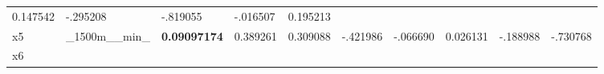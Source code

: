 \documentclass[11pt]{article}
\begin{document}
\begin{longtable}[]{@{}llllllllll@{}}
\begin{minipage}[t]{0.07\columnwidth}
0.147542\strut
\end{minipage} & \begin{minipage}[t]{0.07\columnwidth}\raggedright
-.295208\strut
\end{minipage} & \begin{minipage}[t]{0.07\columnwidth}\raggedright
-.819055\strut
\end{minipage} & \begin{minipage}[t]{0.07\columnwidth}\raggedright
-.016507\strut
\end{minipage} & \begin{minipage}[t]{0.07\columnwidth}\raggedright
0.195213\strut
\end{minipage}\tabularnewline
\begin{minipage}[t]{0.07\columnwidth}\raggedright
x5\strut
\end{minipage} & \begin{minipage}[t]{0.07\columnwidth}\raggedright
\_1500m\_\_min\_\strut
\end{minipage} & \begin{minipage}[t]{0.07\columnwidth}\raggedright
\textbf{0.09097174}\strut
\end{minipage} & \begin{minipage}[t]{0.07\columnwidth}\raggedright
0.389261\strut
\end{minipage} & \begin{minipage}[t]{0.07\columnwidth}\raggedright
0.309088\strut
\end{minipage} & \begin{minipage}[t]{0.07\columnwidth}\raggedright
-.421986\strut
\end{minipage} & \begin{minipage}[t]{0.07\columnwidth}\raggedright
-.066690\strut
\end{minipage} & \begin{minipage}[t]{0.07\columnwidth}\raggedright
0.026131\strut
\end{minipage} & \begin{minipage}[t]{0.07\columnwidth}\raggedright
-.188988\strut
\end{minipage} & \begin{minipage}[t]{0.07\columnwidth}\raggedright
-.730768\strut
\end{minipage}\tabularnewline
\begin{minipage}[t]{0.07\columnwidth}\raggedright
x6\strut
\end{minipage} & \begin{minipage}[t]{0.07\columnwidth}\raggedright

\end{minipage}
\end{longtable}
\end{document}
